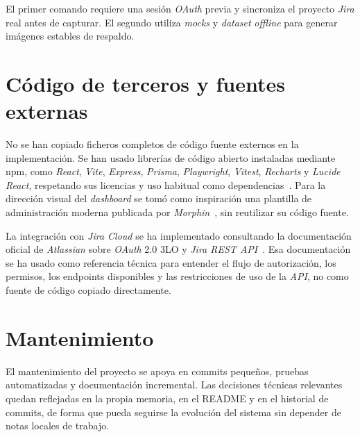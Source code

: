 \begin{refsection}
El primer comando requiere una sesión \textit{OAuth} previa y sincroniza el proyecto \textit{Jira} real antes de capturar. El segundo utiliza \textit{mocks} y \textit{dataset} \textit{offline} para generar imágenes estables de respaldo.

\section{Código de terceros y fuentes externas}

No se han copiado ficheros completos de código fuente externos en la implementación. Se han usado librerías de código abierto instaladas mediante npm, como \textit{React}, \textit{Vite}, \textit{Express}, \textit{Prisma}, \textit{Playwright}, \textit{Vitest}, \textit{Recharts} y \textit{Lucide React}, respetando sus licencias y uso habitual como dependencias~\cite{ReactDocs,ViteDocs,ExpressDocs,PrismaDocs,PlaywrightDocs,VitestGuide,RechartsDocs}. Para la dirección visual del \textit{dashboard} se tomó como inspiración una plantilla de administración moderna publicada por \textit{Morphin}~\cite{MorphinDashboardInspiration}, sin reutilizar su código fuente.

La integración con \textit{Jira Cloud} se ha implementado consultando la documentación oficial de \textit{Atlassian} sobre \textit{OAuth} 2.0 3LO y \textit{Jira REST API}~\cite{AtlassianOAuth3LO,AtlassianJiraRestV3,AtlassianJiraIssuesApi}. Esa documentación se ha usado como referencia técnica para entender el flujo de autorización, los permisos, los endpoints disponibles y las restricciones de uso de la \textit{API}, no como fuente de código copiado directamente.

\section{Mantenimiento}

El mantenimiento del proyecto se apoya en commits pequeños, pruebas automatizadas y documentación incremental. Las decisiones técnicas relevantes quedan reflejadas en la propia memoria, en el README y en el historial de commits, de forma que pueda seguirse la evolución del sistema sin depender de notas locales de trabajo.

{}
\printbibliography[heading=subbibliography]
\end{refsection}


